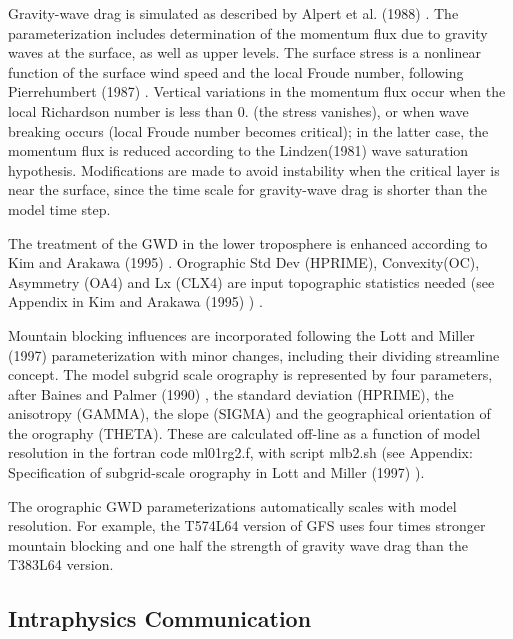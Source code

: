 \begin{DoxyItemize}
\item Gravity-\/wave drag is simulated as described by Alpert et al. (1988) \cite{alpert_et_al_1988}. The parameterization includes determination of the momentum flux due to gravity waves at the surface, as well as upper levels. The surface stress is a nonlinear function of the surface wind speed and the local Froude number, following Pierrehumbert (1987) \cite{pierrehumbert_1987}. Vertical variations in the momentum flux occur when the local Richardson number is less than 0. (the stress vanishes), or when wave breaking occurs (local Froude number becomes critical); in the latter case, the momentum flux is reduced according to the Lindzen(1981) \cite{lindzen_1981} wave saturation hypothesis. Modifications are made to avoid instability when the critical layer is near the surface, since the time scale for gravity-\/wave drag is shorter than the model time step.
\item The treatment of the G\+WD in the lower troposphere is enhanced according to Kim and Arakawa (1995) \cite{kim_and_arakawa_1995} . Orographic Std Dev (H\+P\+R\+I\+ME), Convexity(\+O\+C), Asymmetry (O\+A4) and Lx (C\+L\+X4) are input topographic statistics needed (see Appendix in Kim and Arakawa (1995) \cite{kim_and_arakawa_1995}) .
\item Mountain blocking influences are incorporated following the Lott and Miller (1997) \cite{lott_and_miller_1997} parameterization with minor changes, including their dividing streamline concept. The model subgrid scale orography is represented by four parameters, after Baines and Palmer (1990) \cite{baines_and_palmer_1990}, the standard deviation (H\+P\+R\+I\+ME), the anisotropy (G\+A\+M\+MA), the slope (S\+I\+G\+MA) and the geographical orientation of the orography (T\+H\+E\+TA). These are calculated off-\/line as a function of model resolution in the fortran code ml01rg2.\+f, with script mlb2.\+sh (see Appendix\+: Specification of subgrid-\/scale orography in Lott and Miller (1997) \cite{lott_and_miller_1997}).
\item The orographic G\+WD parameterizations automatically scales with model resolution. For example, the T574\+L64 version of G\+FS uses four times stronger mountain blocking and one half the strength of gravity wave drag than the T383\+L64 version.
\end{DoxyItemize}\hypertarget{group___g_f_s__gwd_intra_gwdps}{}\subsection{Intraphysics Communication}\label{group___g_f_s__gwd_intra_gwdps}

